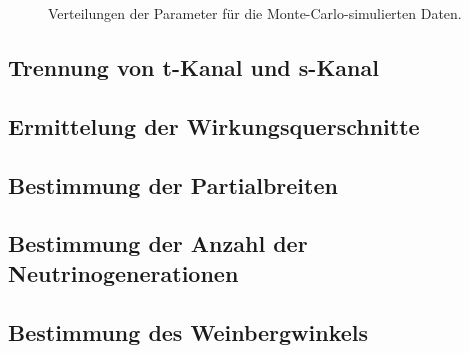 \begin{figure}[h]
	\caption[Verteilungen der Parameter für die Monte-Carlo-simulierten Daten]{Verteilungen der Parameter für die Monte-Carlo-simulierten Daten.}
	\label{fig:mc}
\end{figure}

\subsection{Trennung von t-Kanal und s-Kanal}

\subsection{Ermittelung der Wirkungsquerschnitte}

\subsection{Bestimmung der Partialbreiten}

\subsection{Bestimmung der Anzahl der Neutrinogenerationen}

\subsection{Bestimmung des Weinbergwinkels}